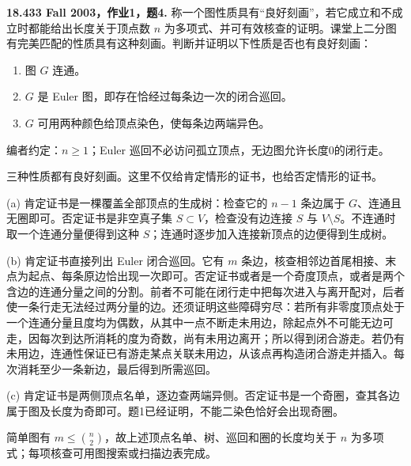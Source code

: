 \begin{exercise}\label{mit:18433-a1-q4}
\textbf{18.433 Fall 2003，作业1，题4.}
称一个图性质具有“良好刻画”，若它成立和不成立时都能给出长度关于顶点数 $n$ 为多项式、并可有效核查的证明。课堂上二分图有完美匹配的性质具有这种刻画。判断并证明以下性质是否也有良好刻画：
\begin{enumerate}[label=(\alph*)]
\item 图 $G$ 连通。
\item $G$ 是 Euler 图，即存在恰经过每条边一次的闭合巡回。
\item $G$ 可用两种颜色给顶点染色，使每条边两端异色。
\end{enumerate}
编者约定：$n\ge1$；Euler 巡回不必访问孤立顶点，无边图允许长度0的闭行走。
\end{exercise}
\begin{solution}
三种性质都有良好刻画。这里不仅给肯定情形的证书，也给否定情形的证书。

(a) 肯定证书是一棵覆盖全部顶点的生成树：检查它的 $n-1$ 条边属于 $G$、连通且无圈即可。否定证书是非空真子集 $S\subset V$，检查没有边连接 $S$ 与 $V\setminus S$。不连通时取一个连通分量便得到这种 $S$；连通时逐步加入连接新顶点的边便得到生成树。

(b) 肯定证书直接列出 Euler 闭合巡回。它有 $m$ 条边，核查相邻边首尾相接、末点为起点、每条原边恰出现一次即可。否定证书或者是一个奇度顶点，或者是两个含边的连通分量之间的分割。前者不可能在闭行走中把每次进入与离开配对，后者使一条行走无法经过两分量的边。还须证明这些障碍穷尽：若所有非零度顶点处于一个连通分量且度均为偶数，从其中一点不断走未用边，除起点外不可能无边可走，因每次到达所消耗的度为奇数，尚有未用边离开；所以得到闭合游走。若仍有未用边，连通性保证已有游走某点关联未用边，从该点再构造闭合游走并插入。每次消耗至少一条新边，最后得到所需巡回。

(c) 肯定证书是两侧顶点名单，逐边查两端异侧。否定证书是一个奇圈，查其各边属于图及长度为奇即可。题1已经证明，不能二染色恰好会出现奇圈。

简单图有 $m\le\binom n2$，故上述顶点名单、树、巡回和圈的长度均关于 $n$ 为多项式；每项核查可用图搜索或扫描边表完成。
\end{solution}

